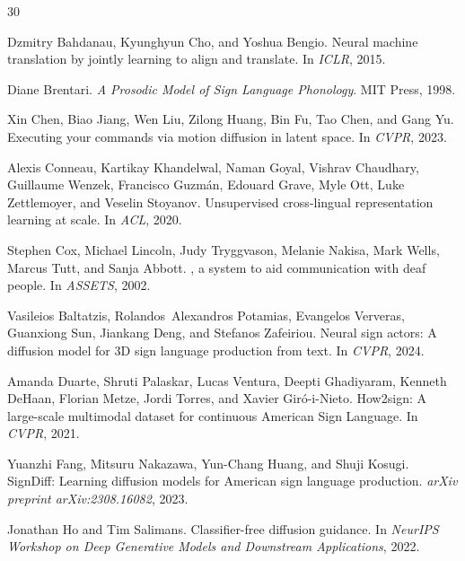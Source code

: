 \documentclass{article}
\begin{document}
\begin{thebibliography}{30}

Dzmitry Bahdanau, Kyunghyun Cho, and Yoshua Bengio.
\newblock Neural machine translation by jointly learning to align and translate.
\newblock In \emph{ICLR}, 2015.

Diane Brentari.
\newblock \emph{A Prosodic Model of Sign Language Phonology}.
\newblock MIT Press, 1998.

Xin Chen, Biao Jiang, Wen Liu, Zilong Huang, Bin Fu, Tao Chen, and Gang Yu.
\newblock Executing your commands via motion diffusion in latent space.
\newblock In \emph{CVPR}, 2023.

Alexis Conneau, Kartikay Khandelwal, Naman Goyal, Vishrav Chaudhary, Guillaume Wenzek, Francisco Guzm{\'a}n, Edouard Grave, Myle Ott, Luke Zettlemoyer, and Veselin Stoyanov.
\newblock Unsupervised cross-lingual representation learning at scale.
\newblock In \emph{ACL}, 2020.

Stephen Cox, Michael Lincoln, Judy Tryggvason, Melanie Nakisa, Mark Wells, Marcus Tutt, and Sanja Abbott.
, a system to aid communication with deaf people.
\newblock In \emph{ASSETS}, 2002.

Vasileios Baltatzis, Rolandos~Alexandros Potamias, Evangelos Ververas, Guanxiong Sun, Jiankang Deng, and Stefanos Zafeiriou.
\newblock Neural sign actors: A diffusion model for {3D} sign language production from text.
\newblock In \emph{CVPR}, 2024.

Amanda Duarte, Shruti Palaskar, Lucas Ventura, Deepti Ghadiyaram, Kenneth DeHaan, Florian Metze, Jordi Torres, and Xavier Gir{\'o}-i-Nieto.
\newblock How2sign: A large-scale multimodal dataset for continuous {A}merican {S}ign {L}anguage.
\newblock In \emph{CVPR}, 2021.

Yuanzhi Fang, Mitsuru Nakazawa, Yun-Chang Huang, and Shuji Kosugi.
\newblock SignDiff: Learning diffusion models for {A}merican sign language production.
\newblock \emph{arXiv preprint arXiv:2308.16082}, 2023.

Jonathan Ho and Tim Salimans.
\newblock Classifier-free diffusion guidance.
\newblock In \emph{NeurIPS Workshop on Deep Generative Models and Downstream Applications}, 2022.


\end{thebibliography}
\end{document}
